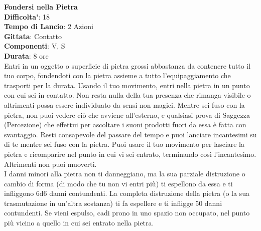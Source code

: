 \begin{multicols}{2}
\medskip\textbf{Fondersi nella Pietra}\\
\textbf{Difficolta'}: 18\\
\textbf{Tempo di Lancio}: 2 Azioni\\
\textbf{Gittata}: Contatto\\
\textbf{Componenti}: V, S\\
\textbf{Durata}: 8 ore\\
Entri in un oggetto o superficie di pietra grossi abbastanza da contenere tutto il tuo corpo, fondendoti con la pietra assieme a tutto l’equipaggiamento che trasporti per la durata. Usando il tuo movimento, entri nella pietra in un punto con cui sei in contatto. Non resta nulla della tua presenza che rimanga visibile o altrimenti possa essere individuato da sensi non magici. Mentre sei fuso con la pietra, non puoi vedere ciò che avviene all’esterno, e qualsiasi prova di Saggezza (Percezione) che effettui per ascoltare i suoni prodotti fuori da essa è fatta con svantaggio. Resti consapevole del passare del tempo e puoi lanciare incantesimi su di te mentre sei fuso con la pietra. Puoi usare il tuo movimento per lasciare la pietra e ricomparire nel punto in cui vi sei entrato, terminando così l’incantesimo. Altrimenti non puoi muoverti.\\
I danni minori alla pietra non ti danneggiano, ma la sua parziale distruzione o cambio di forma (di modo che tu non vi entri più) ti espellono da essa e ti infliggono 6d6 danni contundenti. La completa distruzione della pietra (o la sua trasmutazione in un’altra sostanza) ti fa espellere e ti infligge 50 danni contundenti. Se vieni espulso, cadi prono in uno spazio non occupato, nel punto più vicino a quello in cui sei entrato nella pietra.


\end{multicols}
